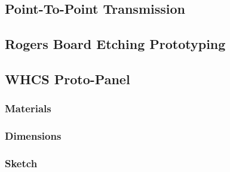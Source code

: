 \tbw

\subsection{Point-To-Point Transmission}

\subsection{Rogers Board Etching Prototyping}

\subsection{WHCS Proto-Panel}

\subsubsection{Materials}

\subsubsection{Dimensions}

\subsubsection{Sketch}

